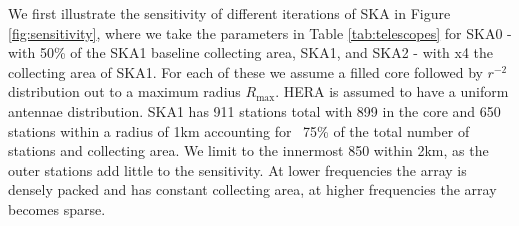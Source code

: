 \documentclass{PoS}
\begin{document}
We first illustrate the sensitivity of different iterations of SKA in Figure \ref{fig:sensitivity}, where we take the parameters in Table \ref{tab:telescopes} for SKA0 - with 50\% of the SKA1 baseline collecting area, SKA1, and SKA2 - with x4 the collecting area of SKA1. For each of these we assume a filled core followed by $r^{-2}$ distribution out to a maximum radius $R_{\max}$. HERA is assumed to have a uniform antennae distribution. SKA1 has 911 stations total with 899 in the core and 650 stations within a radius of 1km accounting for ~75\% of the total number of stations and collecting area. We limit to the innermost 850 within 2km, as the outer stations add little to the sensitivity. At lower frequencies the array is densely packed and has constant collecting area, at higher frequencies the array becomes sparse.
\end{document}
